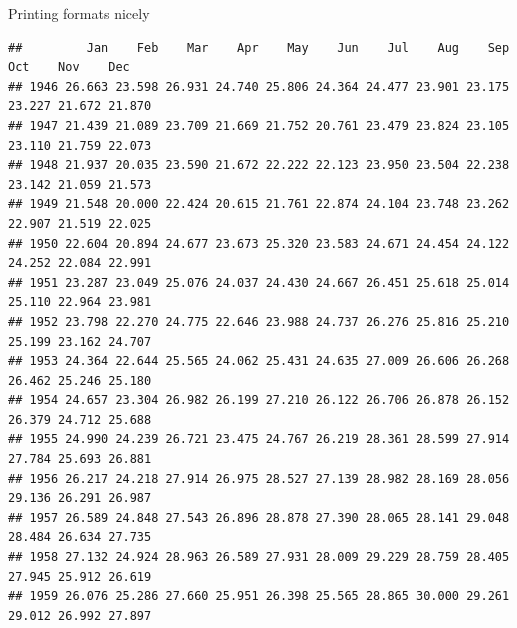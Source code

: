 \begin{frame}[fragile]{Printing formats nicely}
  
{\tiny
\begin{knitrout}
\color{fgcolor}\begin{kframe}
\begin{alltt}
\end{alltt}
\begin{verbatim}
##         Jan    Feb    Mar    Apr    May    Jun    Jul    Aug    Sep    Oct    Nov    Dec
## 1946 26.663 23.598 26.931 24.740 25.806 24.364 24.477 23.901 23.175 23.227 21.672 21.870
## 1947 21.439 21.089 23.709 21.669 21.752 20.761 23.479 23.824 23.105 23.110 21.759 22.073
## 1948 21.937 20.035 23.590 21.672 22.222 22.123 23.950 23.504 22.238 23.142 21.059 21.573
## 1949 21.548 20.000 22.424 20.615 21.761 22.874 24.104 23.748 23.262 22.907 21.519 22.025
## 1950 22.604 20.894 24.677 23.673 25.320 23.583 24.671 24.454 24.122 24.252 22.084 22.991
## 1951 23.287 23.049 25.076 24.037 24.430 24.667 26.451 25.618 25.014 25.110 22.964 23.981
## 1952 23.798 22.270 24.775 22.646 23.988 24.737 26.276 25.816 25.210 25.199 23.162 24.707
## 1953 24.364 22.644 25.565 24.062 25.431 24.635 27.009 26.606 26.268 26.462 25.246 25.180
## 1954 24.657 23.304 26.982 26.199 27.210 26.122 26.706 26.878 26.152 26.379 24.712 25.688
## 1955 24.990 24.239 26.721 23.475 24.767 26.219 28.361 28.599 27.914 27.784 25.693 26.881
## 1956 26.217 24.218 27.914 26.975 28.527 27.139 28.982 28.169 28.056 29.136 26.291 26.987
## 1957 26.589 24.848 27.543 26.896 28.878 27.390 28.065 28.141 29.048 28.484 26.634 27.735
## 1958 27.132 24.924 28.963 26.589 27.931 28.009 29.229 28.759 28.405 27.945 25.912 26.619
## 1959 26.076 25.286 27.660 25.951 26.398 25.565 28.865 30.000 29.261 29.012 26.992 27.897
\end{verbatim}
\end{kframe}
\end{knitrout}
}
  
\end{frame}

